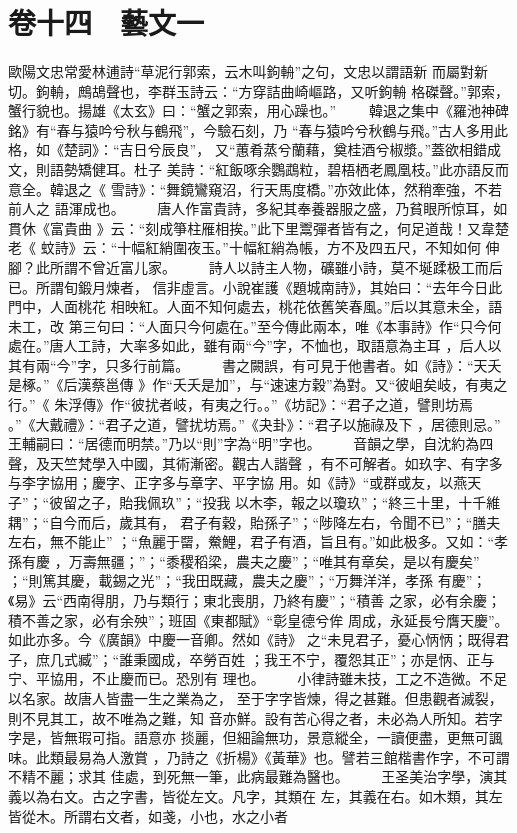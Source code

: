 \documentclass{ctexart}
\begin{document}
\section{卷十四　藝文一}
\paragraph{}
歐陽文忠常愛林逋詩``草泥行郭索，云木叫鉤輈''之句，文忠以謂語新 而屬對新切。鉤輈，鷓鴣聲也，李群玉詩云：``方穿詰曲崎嶇路，又听鉤輈 格磔聲。''郭索，蟹行貌也。揚雄《太玄》曰：``蟹之郭索，用心躁也。'' 　　韓退之集中《羅池神碑銘》有``春与猿吟兮秋与鶴飛''，今驗石刻，乃 ``春与猿吟兮秋鶴与飛。''古人多用此格，如《楚詞》：``吉日兮辰良''， 又``蕙肴蒸兮蘭藉，奠桂酒兮椒漿。''蓋欲相錯成文，則語勢矯健耳。杜子 美詩：``紅飯啄余鸚鵡粒，碧梧栖老鳳凰枝。''此亦語反而意全。韓退之《 雪詩》：``舞鏡鸞窺沼，行天馬度橋。''亦效此体，然稍牽強，不若前人之 語渾成也。 　　唐人作富貴詩，多紀其奉養器服之盛，乃貧眼所惊耳，如貫休《富貴曲 》云：``刻成箏柱雁相挨。''此下里鬻彈者皆有之，何足道哉！又韋楚老《 蚊詩》云：``十幅紅綃圍夜玉。''十幅紅綃為帳，方不及四五尺，不知如何 伸腳？此所謂不曾近富儿家。 　　詩人以詩主人物，礦雖小詩，莫不埏蹂极工而后已。所謂旬鍛月煉者， 信非虛言。小說崔護《題城南詩》，其始曰：``去年今日此門中，人面桃花 相映紅。人面不知何處去，桃花依舊笑春風。''后以其意未全，語未工，改 第三句曰：``人面只今何處在。''至今傳此兩本，唯《本事詩》作``只今何 處在。''唐人工詩，大率多如此，雖有兩``今''字，不恤也，取語意為主耳 ，后人以其有兩``今''字，只多行前篇。 　　書之闕誤，有可見于他書者。如《詩》：``天夭是椓。''《后漢蔡邕傳 》作``夭夭是加''，与``速速方穀''為對。又``彼岨矣岐，有夷之行。''《 朱浮傳》作``彼扰者岐，有夷之行。。''《坊記》：``君子之道，譬則坊焉 。''《大戴禮》：``君子之道，譬扰坊焉。''《夬卦》：``君子以施祿及下 ，居德則忌。'' 王輔嗣曰：``居德而明禁。''乃以``則''字為``明''字也。 　　音韻之學，自沈約為四聲，及天竺梵學入中國，其術漸密。觀古人諧聲 ，有不可解者。如玖字、有字多与李字協用；慶字、正字多与章字、平字協 用。如《詩》``或群或友，以燕天子''；``彼留之子，貽我佩玖''；``投我 以木李，報之以瓊玖''；``終三十里，十千維耦''；``自今而后，歲其有， 君子有穀，貽孫子''；``陟降左右，令聞不已''；``膳夫左右，無不能止'' ；``魚麗于罶，鮝鯉，君子有酒，旨且有。''如此极多。又如：``孝孫有慶 ，万壽無疆；''；``黍稷稻梁，農夫之慶''；``唯其有章矣，是以有慶矣'' ；``則篤其慶，載錫之光''；``我田既藏，農夫之慶''；``万舞洋洋，孝孫 有慶''；《易》云``西南得朋，乃与類行；東北喪朋，乃終有慶''；``積善 之家，必有余慶；積不善之家，必有余殃''；班固《東都賦》``彰皇德兮侔 周成，永延長兮膺天慶''。如此亦多。今《廣韻》中慶一音卿。然如《詩》 之``未見君子，憂心怲怲；既得君子，庶几式臧''；``誰秉國成，卒勞百姓 ；我王不宁，覆怨其正''；亦是怲、正与宁、平協用，不止慶而已。恐別有 理也。 　　小律詩雖未技，工之不造微。不足以名家。故唐人皆盡一生之業為之， 至于字字皆煉，得之甚難。但患觀者滅裂，則不見其工，故不唯為之難，知 音亦鮮。設有苦心得之者，未必為人所知。若字字是，皆無瑕可指。語意亦 掞麗，但細論無功，景意縱全，一讀便盡，更無可諷味。此類最易為人激賞 ，乃詩之《折楊》《黃華》也。譬若三館楷書作字，不可謂不精不麗；求其 佳處，到死無一筆，此病最難為醫也。 　　王圣美治字學，演其義以為右文。古之字書，皆從左文。凡字，其類在 左，其義在右。如木類，其左皆從木。所謂右文者，如戔，小也，水之小者 
\end{document}
